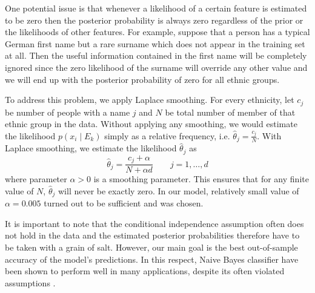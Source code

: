 One potential issue is that whenever a likelihood of a certain feature is estimated to be zero then the posterior probability is always zero regardless of the prior  or the likelihoods of other features. For example, suppose that a person has a typical German first name but a rare surname which does not appear in the training set at all. 
Then the useful information contained in the first name will be completely ignored since the zero likelihood of the surname will override any other value and we will end up with the posterior probability of zero for all ethnic groups.

To address this problem, we apply Laplace smoothing. 
For every ethnicity, let $c_j$ be number of people with a name $j$ and $N$ be total number of member of that ethnic group in the data.  Without applying any smoothing, we would estimate the likelihood  $p(x_i \mid E_k)$ simply as a relative frequency, i.e. $\hat\theta_j = \frac{c_j}{N}$. With  Laplace smoothing, we estimate  the  likelihood $\hat\theta_j$ as 
\begin{equation}
    \hat\theta_j = \frac{c_j + \alpha}{N + \alpha d} \qquad j = 1, \dots, d
\end{equation}
where parameter $\alpha > 0 $ is a smoothing parameter.  This ensures that for any finite value of $N$,  $\hat\theta_j$ will never be exactly zero. %
In our model, relatively small value of  $\alpha = 0.005 $  turned out to be sufficient and  was chosen. 

It is important to note that the conditional independence assumption often does not hold in the data and the estimated posterior probabilities therefore have to be taken with a grain of salt. %
However, our main goal is the best out-of-sample accuracy of the model's predictions. In this respect, Naive Bayes classifier have been shown to perform  well in many applications, despite its often violated assumptions \citep{domingos_optimality_1997}.

